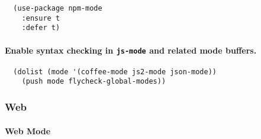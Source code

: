 \documentclass[11pt]{article}
\begin{document}
\begin{verbatim}
  (use-package npm-mode
    :ensure t
    :defer t)
\end{verbatim}
\paragraph*{Enable syntax checking in \texttt{js-mode} and related mode buffers.}
\label{sec:org7be645f}

\begin{verbatim}
  (dolist (mode '(coffee-mode js2-mode json-mode))
    (push mode flycheck-global-modes))
\end{verbatim}

\subsubsection*{Web}
\label{sec:org1f47585}
\paragraph*{Web Mode}
\label{sec:org6b01c90}
\end{document}
